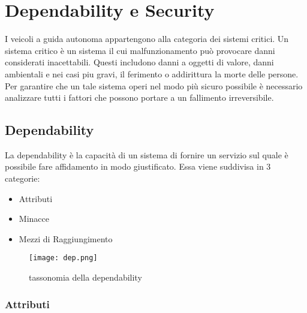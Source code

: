 \section{Dependability e Security}
I veicoli a guida autonoma appartengono alla categoria dei sistemi critici. Un sistema critico è un sistema il cui malfunzionamento può provocare danni
considerati inacettabili. Questi includono danni a oggetti di valore, danni ambientali e nei casi piu gravi, il ferimento o addirittura la morte delle persone.
Per garantire che un tale sistema operi nel modo più sicuro possibile è necessario analizzare tutti i fattori che possono portare a  un fallimento irreversibile.

\subsection{Dependability}
La dependability è la capacità di un sistema di fornire un servizio sul quale è possibile fare affidamento in modo giustificato.
Essa viene suddivisa in 3 categorie:
\begin{itemize}
    \item Attributi
    \item Minacce
    \item Mezzi di Raggiungimento
\end{itemize}
\begin{figure}[h]
    \texttt{[image: dep.png]}
    \caption{tassonomia  della dependability\cite{dep}}
    \label{fig:dep}
\end{figure}
\subsubsection{Attributi}
